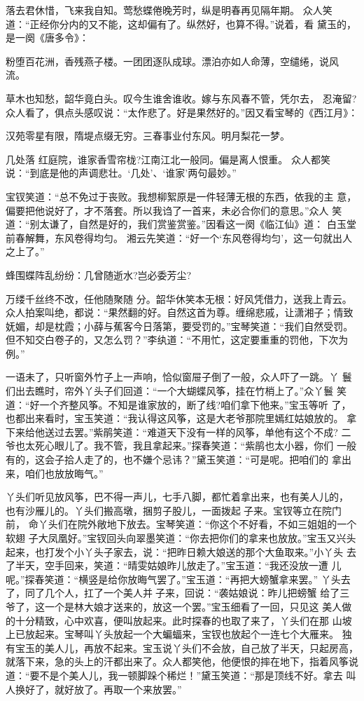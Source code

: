 落去君休惜，飞来我自知。莺愁蝶倦晚芳时，纵是明春再见隔年期。
众人笑道：“正经你分内的又不能，这却偏有了。纵然好，也算不得。”说着，看
黛玉的，是一阕《唐多令》：

粉堕百花洲，香残燕子楼。一团团逐队成球。漂泊亦如人命薄，空缱绻，说风
流。

草木也知愁，韶华竟白头。叹今生谁舍谁收。嫁与东风春不管，凭尔去，
忍淹留?
众人看了，俱点头感叹说：“太作悲了。好是果然好的。”因又看宝琴的《西江月》：

汉苑零星有限，隋堤点缀无穷。三春事业付东风。明月梨花一梦。

几处落
红庭院，谁家香雪帘栊?江南江北一般同。偏是离人恨重。
众人都笑说：“到底是他的声调悲壮。‘几处’、‘谁家’两句最妙。”

宝钗笑道：“总不免过于丧败。我想柳絮原是一件轻薄无根的东西，依我的主
意，偏要把他说好了，才不落套。所以我诌了一首来，未必合你们的意思。”众人
笑道：“别太谦了，自然是好的，我们赏鉴赏鉴。”因看这一阕《临江仙》道：
白玉堂前春解舞，东风卷得均匀。
湘云先笑道：“好一个‘东风卷得均匀’，这一句就出人之上了。”

蜂围蝶阵乱纷纷：几曾随逝水?岂必委芳尘?

万缕千丝终不改，任他随聚随
分。韶华休笑本无根：好风凭借力，送我上青云。
众人拍案叫绝，都说：“果然翻的好。自然这首为尊。缠绵悲戚，让潇湘子；情致
妩媚，却是枕霞；小薛与蕉客今日落第，要受罚的。”宝琴笑道：“我们自然受罚。
但不知交白卷子的，又怎么罚？”李纨道：“不用忙，这定要重重的罚他，下次为
例。”

一语未了，只听窗外竹子上一声响，恰似窗屉子倒了一般，众人吓了一跳。丫
鬟们出去瞧时，帘外丫头子们回道：“一个大蝴蝶风筝，挂在竹梢上了。”众丫鬟
笑道：“好一个齐整风筝。不知是谁家放的，断了线?咱们拿下他来。”宝玉等听
了，也都出来看时，宝玉笑道：“我认得这风筝，这是大老爷那院里嫣红姑娘放的。
拿下来给他送过去罢。”紫鹃笑道：“难道天下没有一样的风筝，单他有这个不成?
二爷也太死心眼儿了。我不管，我且拿起来。”探春笑道：“紫鹃也太小器，你们
一般有的，这会子拾人走了的，也不嫌个忌讳？”黛玉笑道：“可是呢。把咱们的
拿出来，咱们也放放晦气。”

丫头们听见放风筝，巴不得一声儿，七手八脚，都忙着拿出来，也有美人儿的，
也有沙雁儿的。丫头们搬高墩，捆剪子股儿，一面拨起子来。宝钗等立在院门前，
命丫头们在院外敞地下放去。宝琴笑道：“你这个不好看，不如三姐姐的一个软翅
子大凤凰好。”宝钗回头向翠墨笑道：“你去把你们的拿来也放放。”宝玉又兴头
起来，也打发个小丫头子家去，说：“把昨日赖大娘送的那个大鱼取来。”小丫头
去了半天，空手回来，笑道：“晴雯姑娘昨儿放走了。”宝玉道：“我还没放一遭
儿呢。”探春笑道：“横竖是给你放晦气罢了。”宝玉道：“再把大螃蟹拿来罢。”
丫头去了，同了几个人，扛了一个美人并子来，回说：“袭姑娘说：昨儿把螃蟹
给了三爷了，这一个是林大娘才送来的，放这一个罢。”宝玉细看了一回，只见这
美人做的十分精致，心中欢喜，便叫放起来。此时探春的也取了来了，丫头们在那
山坡上已放起来。宝琴叫丫头放起一个大蝙蝠来，宝钗也放起个一连七个大雁来。
独有宝玉的美人儿，再放不起来。宝玉说丫头们不会放，自己放了半天，只起房高，
就落下来，急的头上的汗都出来了。众人都笑他，他便恨的摔在地下，指着风筝说
道：“要不是个美人儿，我一顿脚跺个稀烂！”黛玉笑道：“那是顶线不好。拿去
叫人换好了，就好放了。再取一个来放罢。”

